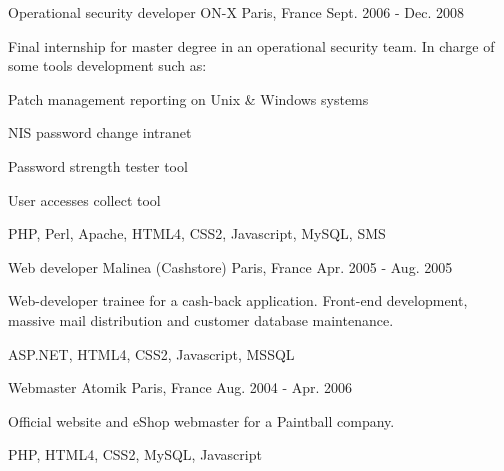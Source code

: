 \begin{cventries}
    \cventry
    {Operational security developer} %
    {ON-X} %
    {Paris, France} %
    {Sept. 2006 - Dec. 2008} %
    { %
        Final internship for master degree in an operational security team. \hfill\break
        In charge of some tools development such as: \hfill\break
        \begin{cvitems}
            \item {Patch management reporting on Unix \& Windows systems}
            \item {NIS password change intranet}
            \item {Password strength tester tool}
            \item {User accesses collect tool}
        \end{cvitems} \hfill\break
        \begin{cvskills}
             {PHP, Perl, Apache, HTML4, CSS2, Javascript, MySQL, SMS}
        \end{cvskills}
    }

    \cventry
    {Web developer} %
    {Malinea (Cashstore)} %
    {Paris, France} %
    {Apr. 2005 - Aug. 2005} %
    { %
        Web-developer trainee for a cash-back application. \hfill\break
        Front-end development, massive mail distribution and customer database maintenance. \hfill\break
        \begin{cvskills}
             {ASP.NET, HTML4, CSS2, Javascript, MSSQL}
        \end{cvskills}
    }

    \cventry
    {Webmaster} %
    {Atomik} %
    {Paris, France} %
    {Aug. 2004 - Apr. 2006} %
    { %
        Official website and eShop webmaster for a Paintball company.
        \begin{cvskills}
             {PHP, HTML4, CSS2, MySQL, Javascript}
        \end{cvskills}
    }
\end{cventries}